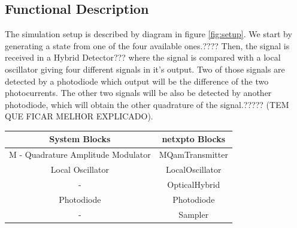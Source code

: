%
%
\subsection*{Functional Description}

The simulation setup is described by diagram in figure \ref{fig:setup}. We start by generating a state from one of the four available ones.???? Then, the signal is received in a Hybrid Detector??? where the signal is compared with a local oscillator giving four different signals in it's output. Two of those signals are detected by a photodiode which output will be the difference of the two photocurrents. The other two signals will be also be detected by another photodiode, which will obtain the other quadrature of the signal.????? (TEM QUE FICAR MELHOR EXPLICADO).

\begin{table}[H]
\centering
\begin{tabular}{c|c}
System Blocks       & netxpto Blocks
\\ \hline
M - Quadrature Amplitude Modulator	& MQamTransmitter\\
Local Oscillator 	& LocalOscillator\\
- 					& OpticalHybrid\\
Photodiode			& Photodiode\\
- 					& Sampler\\
\end{tabular}
\end{table}


